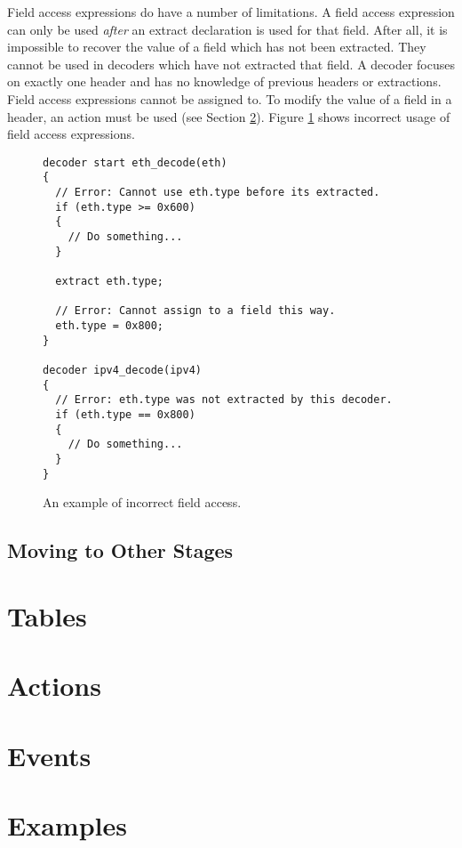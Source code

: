 Field access expressions do have a number of limitations.
A field access expression can only be used \textit{after} an extract declaration is used for that field. After all, it is impossible to recover the value of a field which has not been extracted. They cannot be used in decoders which have not extracted that field. A decoder focuses on exactly one header and has no knowledge of previous headers or extractions. Field access expressions cannot be assigned to. To modify the value of a field in a header, an action must be used (see Section \ref{action_tut}). Figure \ref{fg:bad_access_ex} shows incorrect usage of field access expressions.

\begin{figure}
\begin{lstlisting}
decoder start eth_decode(eth)
{
  // Error: Cannot use eth.type before its extracted.
  if (eth.type >= 0x600) 
  {
    // Do something...
  }
  
  extract eth.type;
  
  // Error: Cannot assign to a field this way.
  eth.type = 0x800;
}

decoder ipv4_decode(ipv4)
{
  // Error: eth.type was not extracted by this decoder.
  if (eth.type == 0x800)
  {
    // Do something...
  }
}
\end{lstlisting}
\caption{An example of incorrect field access.}
\label{fg:bad_access_ex}
\end{figure}

\subsection{Moving to Other Stages} \label{decoder_next_tut}

\section{Tables} \label{table_tut}

\section{Actions} \label{action_tut}

\section{Events} \label{event_tut}

\section{Examples} \label{examples_tut}